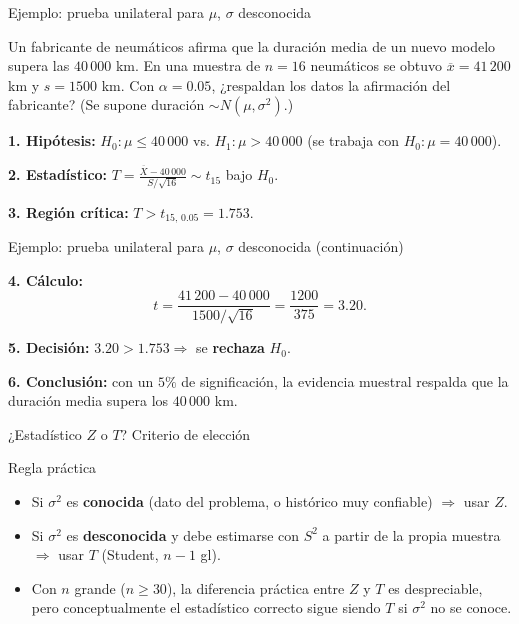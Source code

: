 \documentclass[aspectratio=169,11pt]{beamer}
\begin{document}
\begin{frame}{Ejemplo: prueba unilateral para $\mu$, $\sigma$ desconocida}
\begin{example}
Un fabricante de neumáticos afirma que la duración media de un nuevo modelo supera las $40\,000$ km. En una muestra de $n=16$ neumáticos se obtuvo $\overline{x}=41\,200$ km y $s=1500$ km. Con $\alpha=0.05$, ¿respaldan los datos la afirmación del fabricante? (Se supone duración $\sim N(\mu,\sigma^2)$.)

\textbf{1. Hipótesis:} $H_0:\mu\le 40\,000$ vs. $H_1:\mu>40\,000$ (se trabaja con $H_0:\mu=40\,000$).

\textbf{2. Estadístico:} $\displaystyle T=\frac{\overline{X}-40\,000}{S/\sqrt{16}}\sim t_{15}$ bajo $H_0$.

\textbf{3. Región crítica:} $T>t_{15,\,0.05}=1.753$.

\end{example}
\end{frame}

\begin{frame}{Ejemplo: prueba unilateral para $\mu$, $\sigma$ desconocida (continuación)}
\begin{example}
\textbf{4. Cálculo:}
\[
t=\frac{41\,200-40\,000}{1500/\sqrt{16}}=\frac{1200}{375}=3.20.
\]

\textbf{5. Decisión:} $3.20>1.753 \Rightarrow$ se \textbf{rechaza} $H_0$.

\textbf{6. Conclusión:} con un $5\%$ de significación, la evidencia muestral respalda que la duración media supera los $40\,000$ km.
\end{example}
\end{frame}

\begin{frame}{¿Estadístico $Z$ o $T$? Criterio de elección}
\begin{block}{Regla práctica}
\begin{itemize}
\item Si $\sigma^2$ es \textbf{conocida} (dato del problema, o histórico muy confiable) $\Rightarrow$ usar $Z$.
\item Si $\sigma^2$ es \textbf{desconocida} y debe estimarse con $S^2$ a partir de la propia muestra $\Rightarrow$ usar $T$ (Student, $n-1$ gl).
\item Con $n$ grande ($n\ge30$), la diferencia práctica entre $Z$ y $T$ es despreciable, pero conceptualmente el estadístico correcto sigue siendo $T$ si $\sigma^2$ no se conoce.
\end{itemize}
\end{block}

\end{frame}
\end{document}
